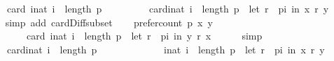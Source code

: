 \begin{isabellebody}
\ \ \ \ \ \ {\isacharparenleft}{\kern0pt}card\ {\isacharbraceleft}{\kern0pt}i{\isacharcolon}{\kern0pt}{\isacharcolon}{\kern0pt}nat{\isachardot}{\kern0pt}\ i\ {\isacharless}{\kern0pt}\ length\ p{\isacharbraceright}{\kern0pt}{\isacharparenright}{\kern0pt}\ {\isacharminus}{\kern0pt}\isanewline
\ \ \ \ \ \ \ \ card{\isacharparenleft}{\kern0pt}{\isacharbraceleft}{\kern0pt}i{\isacharcolon}{\kern0pt}{\isacharcolon}{\kern0pt}nat{\isachardot}{\kern0pt}\ i\ {\isacharless}{\kern0pt}\ length\ p\ {\isasymand}\ {\isacharparenleft}{\kern0pt}let\ r\ {\isacharequal}{\kern0pt}\ {\isacharparenleft}{\kern0pt}p{\isacharbang}{\kern0pt}i{\isacharparenright}{\kern0pt}\ in\ {\isacharparenleft}{\kern0pt}x\ {\isasympreceq}\isactrlsub r\ y{\isacharparenright}{\kern0pt}{\isacharparenright}{\kern0pt}{\isacharbraceright}{\kern0pt}{\isacharparenright}{\kern0pt}{\isachardoublequoteclose}\isanewline
\ \ \ \ \isamarkupfalse%
\ {\isacharparenleft}{\kern0pt}simp\ add{\isacharcolon}{\kern0pt}\ card{\isacharunderscore}{\kern0pt}Diff{\isacharunderscore}{\kern0pt}subset{\isacharparenright}{\kern0pt}\isanewline
\ \ \isamarkupfalse%
\ {\isachardoublequoteopen}prefer{\isacharunderscore}{\kern0pt}count\ p\ x\ y\ {\isacharequal}{\kern0pt}\isanewline
\ \ \ \ \ \ \ \ \ \ card\ {\isacharbraceleft}{\kern0pt}i{\isacharcolon}{\kern0pt}{\isacharcolon}{\kern0pt}nat{\isachardot}{\kern0pt}\ i\ {\isacharless}{\kern0pt}\ length\ p\ {\isasymand}\ {\isacharparenleft}{\kern0pt}let\ r\ {\isacharequal}{\kern0pt}\ {\isacharparenleft}{\kern0pt}p{\isacharbang}{\kern0pt}i{\isacharparenright}{\kern0pt}\ in\ {\isacharparenleft}{\kern0pt}y\ {\isasympreceq}\isactrlsub r\ x{\isacharparenright}{\kern0pt}{\isacharparenright}{\kern0pt}{\isacharbraceright}{\kern0pt}{\isachardoublequoteclose}\isanewline
\ \ \ \ \isamarkupfalse%
\ simp\isanewline
\ \ \isamarkupfalse%
\ \isamarkupfalse%
\isanewline
\ \ \ \ {\isachardoublequoteopen}{\isachardot}{\kern0pt}{\isachardot}{\kern0pt}{\isachardot}{\kern0pt}\ {\isacharequal}{\kern0pt}\ card{\isacharparenleft}{\kern0pt}{\isacharbraceleft}{\kern0pt}i{\isacharcolon}{\kern0pt}{\isacharcolon}{\kern0pt}nat{\isachardot}{\kern0pt}\ i\ {\isacharless}{\kern0pt}\ length\ p{\isacharbraceright}{\kern0pt}\ {\isacharminus}{\kern0pt}\isanewline
\ \ \ \ \ \ \ \ \ \ \ \ {\isacharbraceleft}{\kern0pt}i{\isacharcolon}{\kern0pt}{\isacharcolon}{\kern0pt}nat{\isachardot}{\kern0pt}\ i\ {\isacharless}{\kern0pt}\ length\ p\ {\isasymand}\ {\isacharparenleft}{\kern0pt}let\ r\ {\isacharequal}{\kern0pt}\ {\isacharparenleft}{\kern0pt}p{\isacharbang}{\kern0pt}i{\isacharparenright}{\kern0pt}\ in\ {\isacharparenleft}{\kern0pt}x\ {\isasympreceq}\isactrlsub r\ y{\isacharparenright}{\kern0pt}{\isacharparenright}{\kern0pt}{\isacharbraceright}{\kern0pt}{\isacharparenright}{\kern0pt}{\isachardoublequoteclose}\isanewline

\end{isabellebody}
